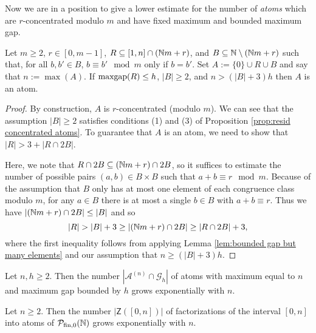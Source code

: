 Now we are in a position to give a lower estimate for the number of \textit{atoms} which are $r$-concentrated modulo $m$ and have fixed maximum and bounded maximum gap.  

\begin{lemma} \label{lem:bounded gap but many elements}
Let $m\ge 2$, $r\in [0,m-1]$, $R\subseteq [1,n]\cap (\mathbb{N} m + r)$, and $B \subseteq \mathbb{N} \setminus (\mathbb{N} m + r)$ such that, for all $b,b'\in B$, $b\equiv b' \mod m$ only if $b=b'$.
Set $A := \{0\}\cup R \cup B$ and say that $n:=\max(A)$.
If $\operatorname{maxgap}(R) \le h$, $|B|\ge 2$, and $n > (|B|+3)h$ then $A$ is an atom.
\end{lemma}

\begin{proof}
By construction, $A$ is $r$-concentrated (modulo $m$). 
We can see that the assumption $|B|\ge 2$ satisfies conditions (1) and (3) of Proposition \ref{prop:resid concentrated atoms}.
To guarantee that $A$ is an atom, we need to show that $|R| > 3 + |R\cap 2B|$.

Here, we note that $R\cap 2B \subseteq (\mathbb{N} m + r) \cap 2B$, so it suffices to estimate the number of possible pairs $(a,b)\in B\times B$ such that $a+b\equiv r\mod m$.
Because of the assumption that $B$ only has at most one element of each congruence class modulo $m$, for any $a\in B$ there is at most a single $b\in B$ with $a+b\equiv r$.  
Thus we have $|(\mathbb{N} m + r)\cap 2B | \le |B|$ and so
\[|R| > |B|+3 \ge |(\mathbb{N} m + r) \cap 2B| \ge |R\cap 2B| + 3,\]
where the first inequality follows from applying Lemma \ref{lem:bounded gap but many elements} and our assumption that $n\ge (|B|+3)h$.
\end{proof}

\begin{prop}
Let $n,h\ge 2$.
Then the number $|\mathcal{A}^{(n)}\cap \mathcal{G}_h|$ of atoms with maximum equal to $n$ and maximum gap bounded by $h$ grows exponentially with $n$.
\end{prop}

\begin{prop}
Let $n\ge 2$.
Then the number $|\mathsf{Z}([0,n])|$ of factorizations of the interval $[0,n]$ into atoms of ${\mathcal{P}_{\textrm{fin},0}(\mathbb{N})}$ grows exponentially with $n$.
\end{prop}